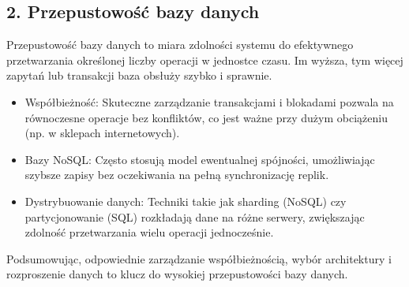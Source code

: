 \documentclass[a4paper,11pt,polish]{sphinxmanual}
\begin{document}
\subsection{2. Przepustowość bazy danych}
\label{\detokenize{Wydajnosc-Skalowanie-i-Replikacja/index:przepustowosc-bazy-danych}}
\sphinxAtStartPar
Przepustowość bazy danych to miara zdolności systemu do efektywnego przetwarzania określonej liczby operacji w jednostce czasu. Im wyższa, tym więcej zapytań lub transakcji baza obsłuży szybko i sprawnie.
\begin{description}
\begin{itemize}
\item {} 
\sphinxAtStartPar
Współbieżność: Skuteczne zarządzanie transakcjami i blokadami pozwala na równoczesne operacje bez konfliktów, co jest ważne przy dużym obciążeniu (np. w sklepach internetowych).

\item {} 
\sphinxAtStartPar
Bazy NoSQL: Często stosują model ewentualnej spójności, umożliwiając szybsze zapisy bez oczekiwania na pełną synchronizację replik.

\item {} 
\sphinxAtStartPar
Dystrybuowanie danych: Techniki takie jak sharding (NoSQL) czy partycjonowanie (SQL) rozkładają dane na różne serwery, zwiększając zdolność przetwarzania wielu operacji jednocześnie.

\end{itemize}

\end{description}

\sphinxAtStartPar
Podsumowując, odpowiednie zarządzanie współbieżnością, wybór architektury i rozproszenie danych to klucz do wysokiej przepustowości bazy danych.
\end{document}
